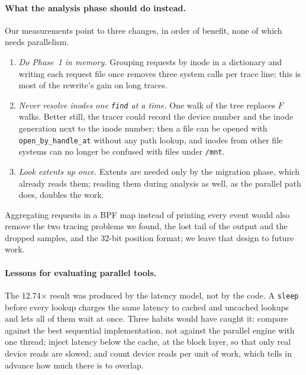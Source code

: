 \paragraph{What the analysis phase should do instead.}
Our measurements point to three changes, in order of benefit, none of which needs
parallelism.
\begin{enumerate}
\item \emph{Do Phase~1 in memory.} Grouping requests by inode in a dictionary and
  writing each request file once removes three system calls per trace line; this is
  most of the rewrite's gain on long traces.
\item \emph{Never resolve inodes one \texttt{find} at a time.} One walk of the tree
  replaces $F$ walks. Better still, the tracer could record the device number and
  the inode generation next to the inode number; then a file can be opened with
  \texttt{open\_by\_handle\_at} without any path lookup, and inodes from other file
  systems can no longer be confused with files under \texttt{/mnt}.
\item \emph{Look extents up once.} Extents are needed only by the migration phase,
  which already reads them; reading them during analysis as well, as the parallel
  path does, doubles the work.
\end{enumerate}
Aggregating requests in a BPF map instead of printing every event would also remove
the two tracing problems we found, the lost tail of the output and the dropped
samples, and the 32-bit position format; we leave that design to future work.

\paragraph{Lessons for evaluating parallel tools.}
The 12.74$\times$ result was produced by the latency model, not by the code. A
\texttt{sleep} before every lookup charges the same latency to cached and uncached
lookups and lets all of them wait at once. Three habits would have caught it: compare
against the best sequential implementation, not against the parallel engine with one
thread; inject latency below the cache, at the block layer, so that only real device
reads are slowed; and count device reads per unit of work, which tells in advance how
much there is to overlap.
